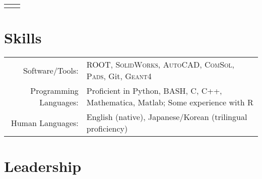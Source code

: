 \documentclass[11pt]{article} %
\begin{document}
\begin{tabularx}{\linewidth}{@{}lR@{}}
{\begin{minipage}[t]{\linewidth}
\begin{itemize}
		\end{itemize}
	\end{minipage}}\\
\end{tabularx}


\section{Skills}

\noindent\begin{tabularx}{\linewidth}{@{}rl}
	Software/Tools: & \textsc{ROOT}, \textsc{SolidWorks}, \textsc{AutoCAD}, \textsc{ComSol}, \textsc{Pads}, Git, \textsc{Geant4}\\
	Programming Languages: & Proficient in Python, BASH, C, C++, Mathematica, Matlab; Some experience with R\\
	Human Languages: & English (native), Japanese/Korean (trilingual proficiency)\\
\end{tabularx}


\section{Leadership}
\end{document}
